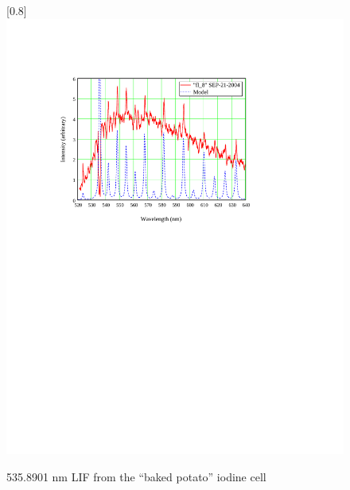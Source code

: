 \begin{figure}
\scalebox{0.8}[0.8]{
\includegraphics[bb=10 430 489 670]
{baked_potato/baked_potato.pdf}
}
\caption{535.8901 nm LIF from the ``baked potato'' iodine cell}
\label{baked_potato}
\end{figure}
